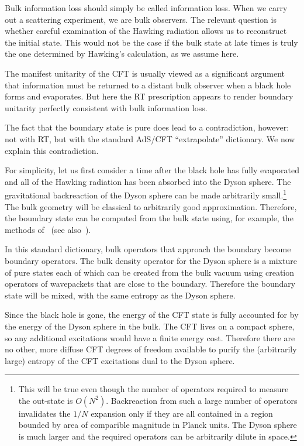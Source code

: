 \documentclass[12pt,letterpaper]{article}
\begin{document}
Bulk information loss should simply be called information loss. When we carry out a scattering experiment, we are bulk observers. The relevant question is whether careful examination of the Hawking radiation allows us to reconstruct the initial state. This would not be the case if the bulk state at late times is truly the one determined by Hawking's calculation, as we assume here.

The manifest unitarity of the CFT is usually viewed as a significant argument that information must be returned to a distant bulk observer when a black hole forms and evaporates. But here the RT prescription appears to render boundary unitarity perfectly consistent with bulk information loss.

The fact that the boundary state is pure does lead to a contradiction, however: not with RT, but with the standard AdS/CFT ``extrapolate'' dictionary. We now explain this contradiction.

For simplicity, let us first consider a time after the black hole has fully evaporated and all of the Hawking radiation has been absorbed into the Dyson sphere. The gravitational backreaction of the Dyson sphere can be made arbitrarily small.\footnote{This will be true even though the number of operators required to measure the out-state is $O(N^2)$. Backreaction from such a large number of operators invalidates the $1/N$ expansion only if they are all contained in a region bounded by area of comparible magnitude in Planck units. The Dyson sphere is much larger and the required operators can be arbitrarily dilute in space.} The bulk geometry will be classical to arbitrarily good approximation. Therefore, the boundary state can be computed from the bulk state using, for example, the methods of~\cite{HamKab05,HamKab06,KabLif11} (see also~\cite{BanDou98,HarSta11}).

In this standard dictionary, bulk operators that approach the boundary become boundary operators. The bulk density operator for the Dyson sphere is a mixture of pure states each of which can be created from the bulk vacuum using creation operators of wavepackets that are close to the boundary. Therefore the boundary state will be mixed, with the same entropy as the Dyson sphere.

Since the black hole is gone, the energy of the CFT state is fully accounted for by the energy of the Dyson sphere in the bulk. The CFT lives on a compact sphere, so any additional excitations would have a finite energy cost. Therefore there are no other, more diffuse CFT degrees of freedom available to purify the (arbitrarily large) entropy of the CFT excitations dual to the Dyson sphere.
\end{document}
